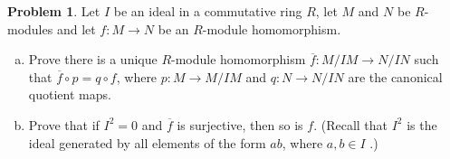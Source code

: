 \documentclass[11pt]{article}
\theoremstyle{definition}
\newtheorem{problem}{Problem}
\begin{document}
\begin{problem} Let $I$ be an ideal in a commutative ring $R$, let $M$ and $N$
  be $R$-modules and let $f : M \to N$ be an $R$-module homomorphism.
  \begin{enumerate}[(a)]
    \item Prove there is a unique $R$-module homomorphism $\overline{f} : M/IM
      \to N/IN$ such that $\overline{f} \circ p = q \circ f$, where $p : M \to
      M/IM$ and $q : N \to N/IN$ are the canonical quotient maps.

      \item Prove that if $I^2 = 0$ and $\overline{f}$ is surjective, then so is $f$. (Recall that $I^2$ is the ideal generated by all elements of the form $ab$, where $a, b\in I$ .)
    \end{enumerate}
    \end{problem}
\end{document}
